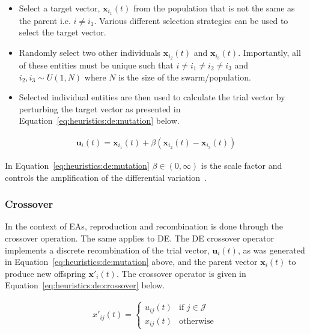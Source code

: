 \begin{itemize}
      \item Select a target vector, $\boldsymbol{x}_{i_{1}}(t)$ from the population that is not the same as the parent i.e. $i \neq i_{1}$. Various different selection strategies can be used to select the target vector.

      \item Randomly select two other individuals $\boldsymbol{x}_{i_{2}}(t)$ and $\boldsymbol{x}_{i_{3}}(t)$. Importantly, all of these entities must be unique such that $i \neq i_{1} \neq i_{2} \neq i_{3}$ and $i_{2}, i_{3} \sim U(1, N)$ where $N$ is the size of the swarm/population.

      \item Selected individual entities are then used to calculate the trial vector by perturbing the target vector as presented in Equation~\eqref{eq:heuristics:de:mutation} below.
\end{itemize}


\begin{equation}
      \label{eq:heuristics:de:mutation}
      \begin{split}
            \boldsymbol{u}_{i}(t) = \boldsymbol{x}_{i_{1}}(t) + \beta(\boldsymbol{x}_{i_{2}}(t) - \boldsymbol{x}_{i_{3}}(t))
      \end{split}
\end{equation}

In Equation~\eqref{eq:heuristics:de:mutation} $\beta \in (0, \infty)$ is the scale factor and controls the amplification of the differential variation~\cite{ref:engelbrecht:2007}.


\subsubsection{Crossover}\label{sec:heuristics:mh:de:crossover}

In the context of \acp{EA}, reproduction and recombination is done through the crossover operation. The same applies to \acs{DE}. The \acs{DE} crossover operator implements a discrete recombination of the trial vector, $\boldsymbol{u}_{i}(t)$, as was generated in Equation~\eqref{eq:heuristics:de:mutation} above, and the parent vector $\boldsymbol{x}_{i}(t)$ to produce new offspring $\boldsymbol{x}'_{i}(t)$. The crossover operator is given in Equation~\eqref{eq:heuristics:de:crossover} below.

\begin{equation}
      \label{eq:heuristics:de:crossover}
      \begin{split}
            x'_{ij}(t)=
            \begin{cases}
                  u_{ij}(t) & \text{if } j \in \mathcal{J} \\
                  x_{ij}(t) & \text{otherwise }
            \end{cases}
      \end{split}
\end{equation}

